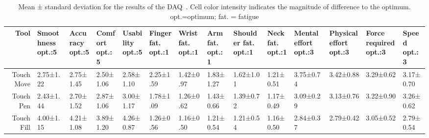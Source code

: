 \begin{table*}[b]
    \centering
        \caption{Mean ± standard deviation for the results of the DAQ~\cite{daq}. Cell color intensity indicates the magnitude of difference to the optimum. opt.=optimum; fat. = fatigue}
    \label{tab:daq}
     \begin{adjustbox}{width=\textwidth}
    \begin{tabular}{rlllllllllllll}
Tool & \makecell{Smoothness\\opt.:5}  & \makecell{Accuracy\\opt.:5}  & \makecell{Comfort\\opt.:5}  & \makecell{Usability\\opt.:5} & \makecell{Finger fat.\\opt.:1} & \makecell{Wrist fat.\\opt.:1} & \makecell{Arm fat.\\opt.:1} & \makecell{Shoulder fat.\\opt.:1} & \makecell{Neck fat.\\opt.:1} & \makecell{Mental effort\\opt.:3}  & \makecell{Physical effort\\opt.:3} & \makecell{Force required \\opt.:3}& \makecell{Speed\\opt.:3} \\
\toprule
Touch Move & 2.75±1.22\cellcolor{lightblue!56} & 2.75±1.45\cellcolor{lightblue!56} & 2.50±1.06\cellcolor{lightblue!62} & 2.58±1.10\cellcolor{lightblue!60} & 2.25±1.59\cellcolor{lightblue!31} & 1.42±0.97\cellcolor{lightblue!10} & 1.83±1.27\cellcolor{lightblue!20} & 1.62±1.01\cellcolor{lightblue!15} & 1.21±0.51\cellcolor{lightblue!5} & 3.75±0.74\cellcolor{lightblue!37} & 3.42±0.88\cellcolor{lightblue!20} & 3.29±0.62\cellcolor{lightblue!14} & 3.17±0.70\cellcolor{lightblue!8} \\
Touch Pen & 2.43±1.44\cellcolor{lightblue!64} & 2.70±1.52\cellcolor{lightblue!57} & 2.87±1.06\cellcolor{lightblue!53} & 3.00±1.17\cellcolor{lightblue!50} & 1.78±1.09\cellcolor{lightblue!19} & 1.26±0.62\cellcolor{lightblue!6} & 1.43±0.66\cellcolor{lightblue!10} & 1.39±0.72\cellcolor{lightblue!9} & 1.17±0.49\cellcolor{lightblue!4} & 3.09±0.29\cellcolor{lightblue!4} & 3.13±0.76\cellcolor{lightblue!6} & 3.22±0.90\cellcolor{lightblue!10} & 3.26±0.62\cellcolor{lightblue!13} \\
Touch Fill & 4.00±1.15\cellcolor{lightblue!25} & 4.21±1.08\cellcolor{lightblue!19} & 3.89±1.20\cellcolor{lightblue!27} & 4.26±0.87\cellcolor{lightblue!18} & 1.26±0.56\cellcolor{lightblue!6} & 1.16±0.50\cellcolor{lightblue!3} & 1.21±0.54\cellcolor{lightblue!5} & 1.21±0.54\cellcolor{lightblue!5} & 1.16±0.50\cellcolor{lightblue!3} & 2.84±0.37\cellcolor{lightblue!7} & 2.79±0.42\cellcolor{lightblue!10} & 3.05±0.52\cellcolor{lightblue!2} & 2.79±0.54\cellcolor{lightblue!10} \\

\end{tabular}
\end{adjustbox}
\end{table*}
